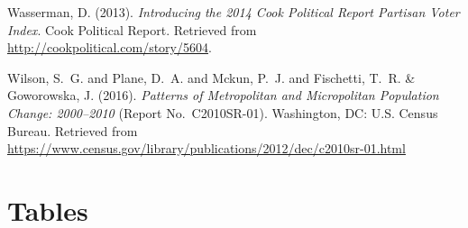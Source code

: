 \documentclass[draft,linenumbers]{agujournal}
\begin{document}
\begin{thebibliography}{33}
  Wasserman, D. (2013).
  \textit{Introducing the 2014 {C}ook {P}olitical {R}eport {P}artisan {V}oter
  {I}ndex}.
  Cook Political Report.
  Retrieved from
  \url{http://cookpolitical.com/story/5604}.

  Wilson, S.~G. and Plane, D.~A. and Mckun, P.~J. and Fischetti, T.~R. \&
  Goworowska, J. (2016).
  \textit{Patterns of Metropolitan and Micropolitan Population Change: 2000--2010\/}
  (Report No.~C2010SR-01).
  Washington, DC:  U.S. Census Bureau.
  Retrieved from
  \url{https://www.census.gov/library/publications/2012/dec/c2010sr-01.html}

\end{thebibliography}

%
%
\clearpage
\section*{Tables}
\end{document}
